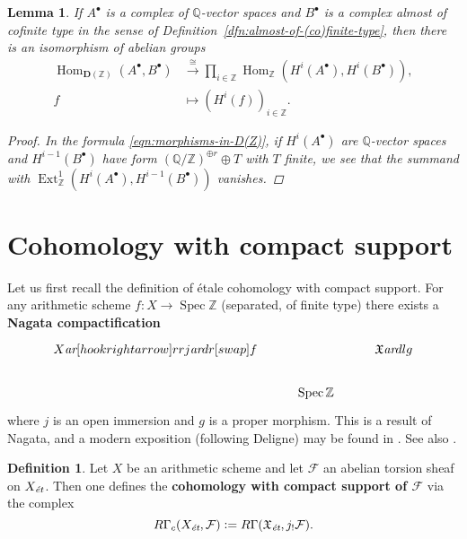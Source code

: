 \documentclass[draft,leqno,12pt]{article}
\theoremstyle{plain}
\newtheorem{lemma}[theorem]{\indent\sc Lemma}
\theoremstyle{definition}
\newtheorem{definition}[theorem]{\indent\sc Definition}
\DeclareMathOperator{\Spec}{Spec}
\DeclareMathOperator{\Hom}{Hom}
\DeclareMathOperator{\Ext}{Ext}
\newcommand{\ZZ}{\mathbb{Z}}
\newcommand{\QQ}{\mathbb{Q}}
\newcommand{\dfn}{\mathrel{\mathop:}=}
\newcommand{\et}{\text{\it \'{e}t}}
\newcommand{\ar}{\text{\it ar}}
\begin{document}
\begin{lemma}
  \label{lemma:morphisms-in-DAb-between-cplx-of-Q-vs-and-almost-cofinite-type-cplx}
  If $A^\bullet$ is a complex of $\QQ$-vector spaces and $B^\bullet$ is a
  complex almost of cofinite type in the sense of
  Definition~\ref{dfn:almost-of-(co)finite-type}, then there is an isomorphism
  of abelian groups
  \begin{align*}
    \Hom_{\mathbf{D} (\ZZ)} (A^\bullet, B^\bullet) & \xrightarrow{\cong}
    \prod_{i\in \ZZ} \Hom_\ZZ (H^i (A^\bullet), H^i (B^\bullet)),\\
    f & \mapsto (H^i (f))_{i\in \ZZ}.
  \end{align*}

  \begin{proof}
    In the formula \eqref{eqn:morphisms-in-D(Z)}, if $H^i (A^\bullet)$ are
    $\QQ$-vector spaces and $H^{i-1} (B^\bullet)$ have form
    $(\QQ/\ZZ)^{\oplus r} \oplus T$ with $T$ finite, we see that the summand with
    $\Ext_\ZZ^1 (H^i (A^\bullet), H^{i-1} (B^\bullet))$ vanishes.
  \end{proof}
\end{lemma}


\pagebreak
\section{Cohomology with compact support}
\label{app:modified-cohomology-with-compact-support}

Let us first recall the definition of \'{e}tale cohomology with compact support.
For any arithmetic scheme $f\colon X\to \Spec \ZZ$ (separated, of finite type)
there exists a \textbf{Nagata compactification}
\[ \begin{tikzcd}
X \ar[hookrightarrow]{rr}{j}\ar{dr}[swap]{f} & & \mathfrak{X} \ar{dl}{g} \\
 & \Spec \ZZ
\end{tikzcd} \]
where $j$ is an open immersion and $g$ is a proper morphism. This is a result of
Nagata, and a modern exposition (following Deligne) may be found in
\cite{Conrad-Deligne-Nagata,Conrad-Deligne-Nagata-erratum}. See also
\cite[Expos\'{e}~XVII]{SGA4}.

\begin{definition}
  Let $X$ be an arithmetic scheme and let $\mathcal{F}$ an abelian torsion
  sheaf on $X_\et$. Then one defines the
  \textbf{cohomology with compact support of $\mathcal{F}$} via the complex
  \begin{equation}
    \label{eqn:RGammac-via-extension-by-zero}
    R\Gamma_c (X_\et, \mathcal{F}) \dfn
    R\Gamma (\mathfrak{X}_\text{\it \'et}, j_! \mathcal{F}).
  \end{equation}
\end{definition}
\end{document}
